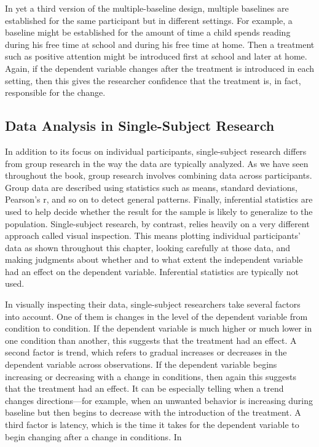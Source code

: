 In yet a third version of the multiple-baseline design, multiple baselines are established for the same participant but in different settings. For example, a baseline might be established for the amount of time a child spends reading during his free time at school and during his free time at home. Then a treatment such as positive attention might be introduced first at school and later at home. Again, if the dependent variable changes after the treatment is introduced in each setting, then this gives the researcher confidence that the treatment is, in fact, responsible for the change.

\subsection{Data Analysis in Single-Subject Research}

In addition to its focus on individual participants, single-subject research differs from group research in the way the data are typically analyzed. As we have seen throughout the book, group research involves combining data across participants. Group data are described using statistics such as means, standard deviations, Pearson's r, and so on to detect general patterns. Finally, inferential statistics are used to help decide whether the result for the sample is likely to generalize to the population. Single-subject research, by contrast, relies heavily on a very different approach called visual inspection. This means plotting individual participants' data as shown throughout this chapter, looking carefully at those data, and making judgments about whether and to what extent the independent variable had an effect on the dependent variable. Inferential statistics are typically not used.

In visually inspecting their data, single-subject researchers take several factors into account. One of them is changes in the level of the dependent variable from condition to condition. If the dependent variable is much higher or much lower in one condition than another, this suggests that the treatment had an effect. A second factor is trend, which refers to gradual increases or decreases in the dependent variable across observations. If the dependent variable begins increasing or decreasing with a change in conditions, then again this suggests that the treatment had an effect. It can be especially telling when a trend changes directions---for example, when an unwanted behavior is increasing during baseline but then begins to decrease with the introduction of the treatment. A third factor is latency, which is the time it takes for the dependent variable to begin changing after a change in conditions. In



